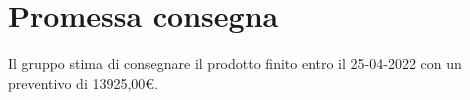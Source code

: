 \section{Promessa consegna}\label{section:Promessa_consegna}

Il gruppo stima di consegnare il prodotto finito entro il 25-04-2022 con un preventivo di 13925,00€.
